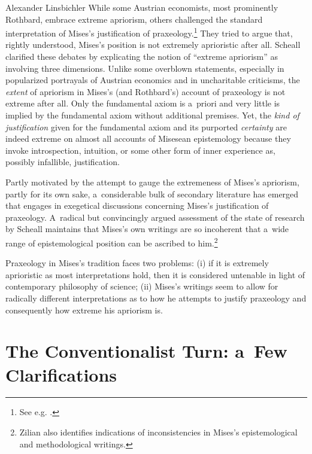 \begin{artengenv}{Alexander Linsbichler}
While some Austrian economists, most prominently Rothbard, embrace extreme apriorism, others challenged the standard interpretation of Mises's justification of praxeology.\footnote{See e.g. 
\parencite[][]{zanotti_hermeneutics_2023}.%
} They tried to argue that, rightly understood, Mises's position is not extremely aprioristic after all. Scheall 
\parencite[][]{scheall_review_2017} %
 clarified these debates by explicating the notion of ``extreme apriorism'' as involving three dimensions. Unlike some overblown statements, especially in popularized portrayals of Austrian economics and in uncharitable criticisms, the \textit{extent} of apriorism in Mises's (and Rothbard's) account of praxeology is not extreme after all. Only the fundamental axiom is a~priori and very little is implied by the fundamental axiom without additional premises. Yet, the \textit{kind of justification} given for the fundamental axiom and its purported \textit{certainty} are indeed extreme on almost all accounts of Misesean epistemology because they invoke introspection, intuition, or some other form of inner experience as, possibly infallible, justification.



Partly motivated by the attempt to gauge the extremeness of Mises's apriorism, partly for its own sake, a~considerable bulk of secondary literature has emerged that engages in exegetical discussions concerning Mises's justification of praxeology. A~radical but convincingly argued assessment of the state of research by Scheall 
\parencite*[][]{scheall_rise_2023} %
 maintains that Mises's own writings are so incoherent that a~wide range of epistemological position can be ascribed to him.\footnote{Zilian 
\parencite*[][]{zilian_klarheit_1990} %
 also identifies indications of inconsistencies in Mises's epistemological and methodological writings.}



Praxeology in Mises's tradition faces two problems: (i) if it is extremely aprioristic as most interpretations hold, then it is considered untenable in light of contemporary philosophy of science; (ii) Mises's writings seem to allow for radically different interpretations as to how he attempts to justify praxeology and consequently how extreme his apriorism is.



\section{The Conventionalist Turn: a~Few Clarifications}


\end{artengenv}
